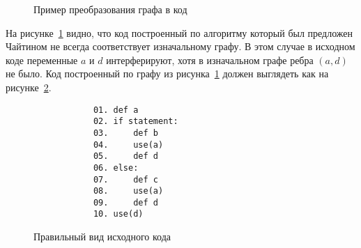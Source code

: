 \begin{example}

    \begin{figure}
        \centering
    \caption{Пример преобразования графа в код}
    \label{fig:ex2}
    \end{figure}

    На рисунке~\ref{fig:ex2} видно, что код построенный по алгоритму который был предложен Чайтином не
    всегда соответствует изначальному графу. В этом случае в исходном коде переменные
    $a$ и $d$ интерферируют, хотя в изначальном графе ребра $(a, d)$ не было. Код построенный
    по графу из рисунка~\ref{fig:ex2} должен выглядеть как на рисунке~\ref{fig:right_ex2}.

    \begin{figure}
        \centering
        \lstset{basicstyle=\ttfamily\small, frame=single}
        \begin{lstlisting}
            01. def a
            02. if statement:
            03.     def b
            04.     use(a)
            05.     def d 
            06. else:
            07.     def c
            08.     use(a)
            09.     def d
            10. use(d)
        \end{lstlisting}
        \caption{Правильный вид исходного кода}
        \label{fig:right_ex2}
    \end{figure}
\end{example}

